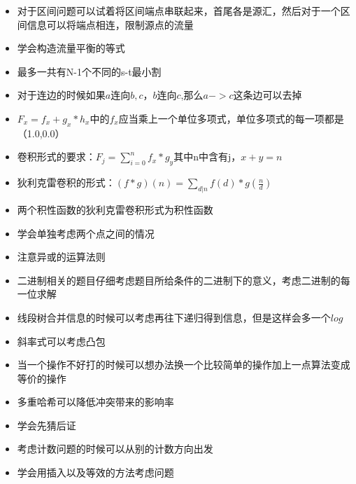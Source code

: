 \documentclass[a4paper]{article}
\begin{document}
		\begin{itemize}
		
		\item 对于区间问题可以试着将区间端点串联起来，首尾各是源汇，然后对于一个区间信息可以将端点相连，限制源点的流量
		
		\item 学会构造流量平衡的等式
		
		\item 最多一共有N-1个不同的s-t最小割
		
		\item 对于连边的时候如果$a$连向$b,c$，$b$连向$c$,那么$a->c$这条边可以去掉
		
		\item $F_x = f_x + g_x * h_x中的f_x$应当乘上一个单位多项式，单位多项式的每一项都是（1.0,0.0）
		
		\item 卷积形式的要求：$F_j = \sum_{i=0}^nf_x*g_y$其中n中含有j，$x+y=n$
		
		\item 狄利克雷卷积的形式：$(f*g)(n)=\sum_{d|n}f(d)*g(\frac{n}{d}) $
		
		\item 两个积性函数的狄利克雷卷积形式为积性函数
		
		\item 学会单独考虑两个点之间的情况
		
		\item 注意异或的运算法则
		
		\item 二进制相关的题目仔细考虑题目所给条件的二进制下的意义，考虑二进制的每一位求解
		
		\item 线段树合并信息的时候可以考虑再往下递归得到信息，但是这样会多一个$log$
		
		\item 斜率式可以考虑凸包
		
		\item 当一个操作不好打的时候可以想办法换一个比较简单的操作加上一点算法变成等价的操作
		
		\item 多重哈希可以降低冲突带来的影响率
		
		\item 学会先猜后证
		
		\item 考虑计数问题的时候可以从别的计数方向出发
		
		\item 学会用插入以及等效的方法考虑问题
		

\end{itemize}
\end{document}
